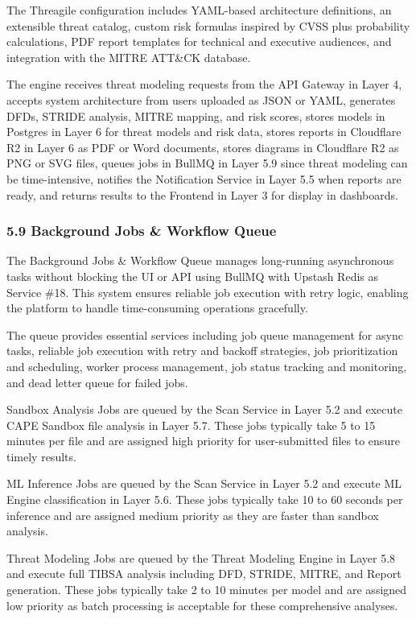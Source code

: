\documentclass[12pt,a4paper]{report}
\begin{document}
The Threagile configuration includes YAML-based architecture definitions, an extensible threat catalog, custom risk formulas inspired by CVSS plus probability calculations, PDF report templates for technical and executive audiences, and integration with the MITRE ATT\&CK database.

The engine receives threat modeling requests from the API Gateway in Layer 4, accepts system architecture from users uploaded as JSON or YAML, generates DFDs, STRIDE analysis, MITRE mapping, and risk scores, stores models in Postgres in Layer 6 for threat models and risk data, stores reports in Cloudflare R2 in Layer 6 as PDF or Word documents, stores diagrams in Cloudflare R2 as PNG or SVG files, queues jobs in BullMQ in Layer 5.9 since threat modeling can be time-intensive, notifies the Notification Service in Layer 5.5 when reports are ready, and returns results to the Frontend in Layer 3 for display in dashboards.

\subsubsection{5.9 Background Jobs \& Workflow Queue}

The Background Jobs \& Workflow Queue manages long-running asynchronous tasks without blocking the UI or API using BullMQ with Upstash Redis as Service \#18. This system ensures reliable job execution with retry logic, enabling the platform to handle time-consuming operations gracefully.

The queue provides essential services including job queue management for async tasks, reliable job execution with retry and backoff strategies, job prioritization and scheduling, worker process management, job status tracking and monitoring, and dead letter queue for failed jobs.

Sandbox Analysis Jobs are queued by the Scan Service in Layer 5.2 and execute CAPE Sandbox file analysis in Layer 5.7. These jobs typically take 5 to 15 minutes per file and are assigned high priority for user-submitted files to ensure timely results.

ML Inference Jobs are queued by the Scan Service in Layer 5.2 and execute ML Engine classification in Layer 5.6. These jobs typically take 10 to 60 seconds per inference and are assigned medium priority as they are faster than sandbox analysis.

Threat Modeling Jobs are queued by the Threat Modeling Engine in Layer 5.8 and execute full TIBSA analysis including DFD, STRIDE, MITRE, and Report generation. These jobs typically take 2 to 10 minutes per model and are assigned low priority as batch processing is acceptable for these comprehensive analyses.
\end{document}
